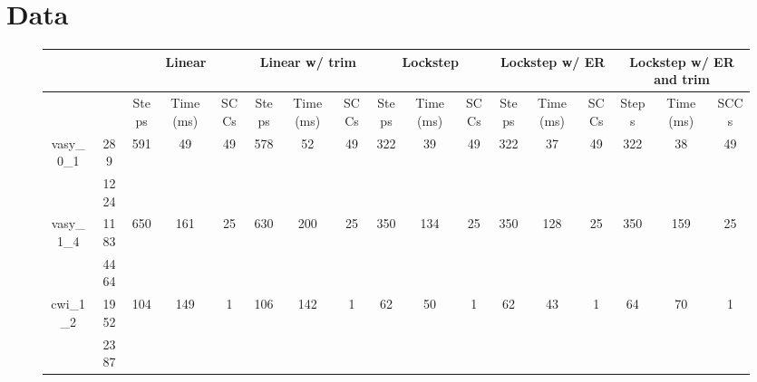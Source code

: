 \documentclass[../master/master.tex]{subfiles}
\begin{document}
\section{Data}
\begin{figure}
\begin{adjustbox}{angle=90}
\centering
\begin{tabular}{ |c|c||c|c|c||c|c|c||c|c|c||c|c|c||c|c|c|| } 
\hline
 \multicolumn{2}{|c||}{} & \multicolumn{3}{c||}{Linear} & \multicolumn{3}{c||}{Linear w/ trim} & \multicolumn{3}{c||}{Lockstep} & \multicolumn{3}{c||}{Lockstep w/ ER} & \multicolumn{3}{c||}{Lockstep w/ ER and trim}\\
\hline
\multicolumn{2}{|c||}{}& Steps & Time (ms) & SCCs& Steps & Time (ms) & SCCs& Steps & Time (ms) & SCCs& Steps & Time (ms) & SCCs& Steps & Time (ms) & SCCs\\
\hline
\multirow{2}{3.6em}{vasy\_0\_1} & 289 & \multirow{2}{3.6em}{591} & \multirow{2}{3.6em}{49} & \multirow{2}{3.6em}{49} & \multirow{2}{3.6em}{578} & \multirow{2}{3.6em}{52} & \multirow{2}{3.6em}{49} & \multirow{2}{3.6em}{322} & \multirow{2}{3.6em}{39} & \multirow{2}{3.6em}{49} & \multirow{2}{3.6em}{322} & \multirow{2}{3.6em}{37} & \multirow{2}{3.6em}{49} & \multirow{2}{3.6em}{322} & \multirow{2}{3.6em}{38} & \multirow{2}{3.6em}{49} \\
\cline{2-2}
 & 1224  &  &  &  &  &  &  &  &  &  &  &  &  &  &  &  \\
\hline
\multirow{2}{3.6em}{vasy\_1\_4} & 1183 & \multirow{2}{3.6em}{650} & \multirow{2}{3.6em}{161} & \multirow{2}{3.6em}{25} & \multirow{2}{3.6em}{630} & \multirow{2}{3.6em}{200} & \multirow{2}{3.6em}{25} & \multirow{2}{3.6em}{350} & \multirow{2}{3.6em}{134} & \multirow{2}{3.6em}{25} & \multirow{2}{3.6em}{350} & \multirow{2}{3.6em}{128} & \multirow{2}{3.6em}{25} & \multirow{2}{3.6em}{350} & \multirow{2}{3.6em}{159} & \multirow{2}{3.6em}{25} \\
\cline{2-2}
 & 4464  &  &  &  &  &  &  &  &  &  &  &  &  &  &  &  \\
\hline
\multirow{2}{3.6em}{cwi\_1\_2} & 1952 & \multirow{2}{3.6em}{104} & \multirow{2}{3.6em}{149} & \multirow{2}{3.6em}{1} & \multirow{2}{3.6em}{106} & \multirow{2}{3.6em}{142} & \multirow{2}{3.6em}{1} & \multirow{2}{3.6em}{62} & \multirow{2}{3.6em}{50} & \multirow{2}{3.6em}{1} & \multirow{2}{3.6em}{62} & \multirow{2}{3.6em}{43} & \multirow{2}{3.6em}{1} & \multirow{2}{3.6em}{64} & \multirow{2}{3.6em}{70} & \multirow{2}{3.6em}{1} \\
\cline{2-2}
 & 2387  &  &  &  &  &  &  &  &  &  &  &  &  &  &  &  \\

\end{tabular}
\end{adjustbox}
\end{figure}
\end{document}
